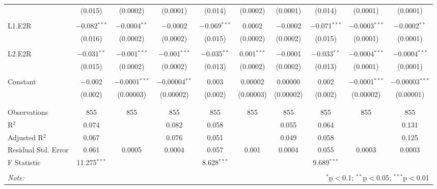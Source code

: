 \documentclass[a4paper]{article}
\begin{document}
\begin{table}[!htbp]
{\begin{tabular}{@{\extracolsep{5pt}}lccccccccc}
  & (0.015) & (0.0002) & (0.0001) & (0.014) & (0.0002) & (0.0001) & (0.014) & (0.0001) & (0.0001) \\ 
  & & & & & & & & & \\ 
 L1.E2R & $-$0.082$^{***}$ & $-$0.0004$^{**}$ & $-$0.0002 & $-$0.069$^{***}$ & 0.0002 & $-$0.0002 & $-$0.071$^{***}$ & $-$0.0003$^{***}$ & $-$0.0002$^{**}$ \\ 
  & (0.016) & (0.0002) & (0.0002) & (0.015) & (0.0002) & (0.0002) & (0.015) & (0.0001) & (0.0001) \\ 
  & & & & & & & & & \\ 
 L2.E2R & $-$0.031$^{**}$ & $-$0.001$^{***}$ & $-$0.001$^{***}$ & $-$0.035$^{**}$ & 0.001$^{***}$ & $-$0.0001 & $-$0.033$^{**}$ & $-$0.0004$^{***}$ & $-$0.0004$^{***}$ \\ 
  & (0.015) & (0.0002) & (0.0002) & (0.013) & (0.0002) & (0.0002) & (0.013) & (0.0001) & (0.0001) \\ 
  & & & & & & & & & \\ 
 Constant & $-$0.002 & $-$0.0001$^{***}$ & $-$0.00004$^{**}$ & 0.003 & 0.00002 & 0.00000 & 0.002 & $-$0.0001$^{***}$ & $-$0.00003$^{***}$ \\ 
  & (0.002) & (0.00003) & (0.00002) & (0.002) & (0.00003) & (0.00002) & (0.002) & (0.00002) & (0.00001) \\ 
  & & & & & & & & & \\ 
\hline \\[-1.8ex] 
Observations & 855 & 855 & 855 & 855 & 855 & 855 & 855 & 855 & 855 \\ 
R$^{2}$ & 0.074 &  & 0.082 & 0.058 &  & 0.055 & 0.064 &  & 0.131 \\ 
Adjusted R$^{2}$ & 0.067 &  & 0.076 & 0.051 &  & 0.049 & 0.058 &  & 0.125 \\ 
Residual Std. Error & 0.061 & 0.0005 & 0.0004 & 0.057 & 0.001 & 0.0004 & 0.055 & 0.0003 & 0.0003 \\ 
F Statistic & 11.275$^{***}$ &  &  & 8.628$^{***}$ &  &  & 9.689$^{***}$ &  &  \\ 
\hline 
\hline \\[-1.8ex] 
\textit{Note:}  & \multicolumn{9}{r}{$^{*}$p$<$0.1; $^{**}$p$<$0.05; $^{***}$p$<$0.01} \\ 
\end{tabular} 
}
\end{table} 
\FloatBarrier
\end{document}
